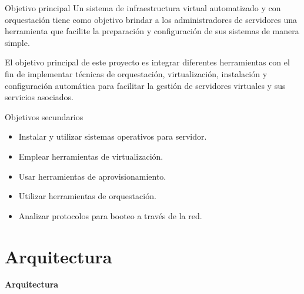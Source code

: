 \begin{frame}{Objetivo principal}
    \vspace{-1.5cm}
    Un sistema de infraestructura virtual automatizado y con orquestación tiene como objetivo brindar a los administradores de servidores una herramienta que facilite la preparación y configuración de sus sistemas de manera simple.

    \begin{block}{}
        El objetivo principal de este proyecto es integrar diferentes herramientas con el fin de implementar técnicas de orquestación, virtualización, instalación y configuración automática para facilitar la gestión de servidores virtuales y sus servicios asociados.
    \end{block}

\end{frame}


\begin{frame}{Objetivos secundarios}
\vspace{-1.5cm}
\begin{itemize}
    \item Instalar y utilizar sistemas operativos para servidor.
    \item Emplear herramientas de virtualización.
    \item Usar herramientas de aprovisionamiento.
    \item Utilizar herramientas de orquestación.
    \item Analizar protocolos para booteo a través de la red.
\end{itemize}

\end{frame}


\section{Arquitectura}

\begin{frame}
    \Huge
    \centering
    \textbf{Arquitectura}

\end{frame}

